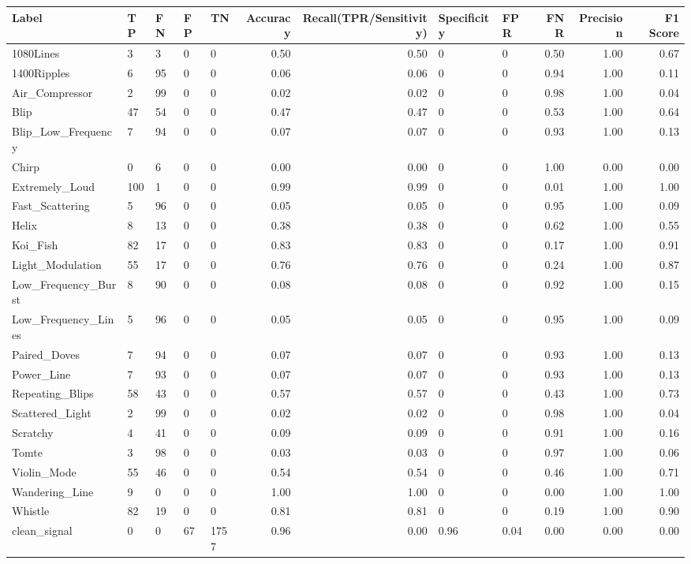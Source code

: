 \begin{tabular}{lllllrrllrrr}
\toprule
Label & TP & FN & FP & TN & Accuracy & Recall(TPR/Sensitivity) & Specificity & FPR & FNR & Precision & F1 Score \\
\midrule
1080Lines & 3 & 3 & 0 & 0 & 0.50 & 0.50 & 0 & 0 & 0.50 & 1.00 & 0.67 \\
1400Ripples & 6 & 95 & 0 & 0 & 0.06 & 0.06 & 0 & 0 & 0.94 & 1.00 & 0.11 \\
Air_Compressor & 2 & 99 & 0 & 0 & 0.02 & 0.02 & 0 & 0 & 0.98 & 1.00 & 0.04 \\
Blip & 47 & 54 & 0 & 0 & 0.47 & 0.47 & 0 & 0 & 0.53 & 1.00 & 0.64 \\
Blip_Low_Frequency & 7 & 94 & 0 & 0 & 0.07 & 0.07 & 0 & 0 & 0.93 & 1.00 & 0.13 \\
Chirp & 0 & 6 & 0 & 0 & 0.00 & 0.00 & 0 & 0 & 1.00 & 0.00 & 0.00 \\
Extremely_Loud & 100 & 1 & 0 & 0 & 0.99 & 0.99 & 0 & 0 & 0.01 & 1.00 & 1.00 \\
Fast_Scattering & 5 & 96 & 0 & 0 & 0.05 & 0.05 & 0 & 0 & 0.95 & 1.00 & 0.09 \\
Helix & 8 & 13 & 0 & 0 & 0.38 & 0.38 & 0 & 0 & 0.62 & 1.00 & 0.55 \\
Koi_Fish & 82 & 17 & 0 & 0 & 0.83 & 0.83 & 0 & 0 & 0.17 & 1.00 & 0.91 \\
Light_Modulation & 55 & 17 & 0 & 0 & 0.76 & 0.76 & 0 & 0 & 0.24 & 1.00 & 0.87 \\
Low_Frequency_Burst & 8 & 90 & 0 & 0 & 0.08 & 0.08 & 0 & 0 & 0.92 & 1.00 & 0.15 \\
Low_Frequency_Lines & 5 & 96 & 0 & 0 & 0.05 & 0.05 & 0 & 0 & 0.95 & 1.00 & 0.09 \\
Paired_Doves & 7 & 94 & 0 & 0 & 0.07 & 0.07 & 0 & 0 & 0.93 & 1.00 & 0.13 \\
Power_Line & 7 & 93 & 0 & 0 & 0.07 & 0.07 & 0 & 0 & 0.93 & 1.00 & 0.13 \\
Repeating_Blips & 58 & 43 & 0 & 0 & 0.57 & 0.57 & 0 & 0 & 0.43 & 1.00 & 0.73 \\
Scattered_Light & 2 & 99 & 0 & 0 & 0.02 & 0.02 & 0 & 0 & 0.98 & 1.00 & 0.04 \\
Scratchy & 4 & 41 & 0 & 0 & 0.09 & 0.09 & 0 & 0 & 0.91 & 1.00 & 0.16 \\
Tomte & 3 & 98 & 0 & 0 & 0.03 & 0.03 & 0 & 0 & 0.97 & 1.00 & 0.06 \\
Violin_Mode & 55 & 46 & 0 & 0 & 0.54 & 0.54 & 0 & 0 & 0.46 & 1.00 & 0.71 \\
Wandering_Line & 9 & 0 & 0 & 0 & 1.00 & 1.00 & 0 & 0 & 0.00 & 1.00 & 1.00 \\
Whistle & 82 & 19 & 0 & 0 & 0.81 & 0.81 & 0 & 0 & 0.19 & 1.00 & 0.90 \\
clean_signal & 0 & 0 & 67 & 1757 & 0.96 & 0.00 & 0.96 & 0.04 & 0.00 & 0.00 & 0.00 \\
\bottomrule
\end{tabular}
